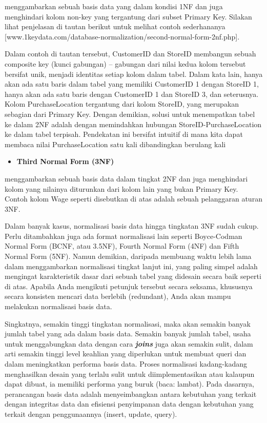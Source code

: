 \documentclass[]{book}
\providecommand{\tightlist}{%
  \setlength{\itemsep}{0pt}\setlength{\parskip}{0pt}}
\begin{document}
menggambarkan sebuah basis data yang dalam kondisi 1NF dan juga menghindari kolom non-key yang tergantung dari subset Primary Key. Silakan lihat penjelasan di tautan berikut untuk melihat contoh sederhananya {[}www.1keydata.com/database-normalization/second-normal-form-2nf.php{]}.

Dalam contoh di tautan tersebut, CustomerID dan StoreID membangun sebuah composite key (kunci gabungan) -- gabungan dari nilai kedua kolom tersebut bersifat unik, menjadi identitas setiap kolom dalam tabel. Dalam kata lain, hanya akan ada satu baris dalam tabel yang memiliki CustomerID 1 dengan StoreID 1, hanya akan ada satu baris dengan CustomerID 1 dan StoreID 3, dan seterusnya. Kolom PurchaseLocation tergantung dari kolom StoreID, yang merupakan sebagian dari Primary Key. Dengan demikian, solusi untuk menempatkan tabel ke dalam 2NF adalah dengan memindahkan hubungan StoreID-PurchaseLocation ke dalam tabel terpisah. Pendekatan ini bersifat intuitif di mana kita dapat membaca nilai PurchaseLocation satu kali dibandingkan berulang kali

\begin{itemize}
\tightlist
\item
  \textbf{Third Normal Form (3NF)}
\end{itemize}

menggambarkan sebuah basis data dalam tingkat 2NF dan juga menghindari kolom yang nilainya diturunkan dari kolom lain yang bukan Primary Key. Contoh kolom Wage seperti disebutkan di atas adalah sebuah pelanggaran aturan 3NF.

Dalam banyak kasus, normalisasi basis data hingga tingkatan 3NF sudah cukup. Perlu ditambahkan juga ada format normalisasi lain seperti Boyce-Codman Normal Form (BCNF, atau 3.5NF), Fourth Normal Form (4NF) dan Fifth Normal Form (5NF). Namun demikian, daripada membuang waktu lebih lama dalam menggambarkan normalisasi tingkat lanjut ini, yang paling simpel adalah mengingat karakteristik dasar dari sebuah tabel yang didesain secara baik seperti di atas. Apabila Anda mengikuti petunjuk tersebut secara seksama, khususnya secara konsisten mencari data berlebih (redundant), Anda akan mampu melakukan normalisasi basis data.

Singkatnya, semakin tinggi tingkatan normalisasi, maka akan semakin banyak jumlah tabel yang ada dalam basis data. Semakin banyak jumlah tabel, usaha untuk menggabungkan data dengan cara \emph{\textbf{joins}} juga akan semakin sulit, dalam arti semakin tinggi level keahlian yang diperlukan untuk membuat queri dan dalam meningkatkan performa basis data. Proses normalisasi kadang-kadang menghasilkan desain yang terlalu sulit untuk diimplementasikan atau kalaupun dapat dibuat, ia memiliki performa yang buruk (baca: lambat). Pada dasarnya, perancangan basis data adalah menyeimbangkan antara kebutuhan yang terkait dengan integritas data dan efisiensi penyimpanan data dengan kebutuhan yang terkait dengan penggunaannya (insert, update, query).
\end{document}

